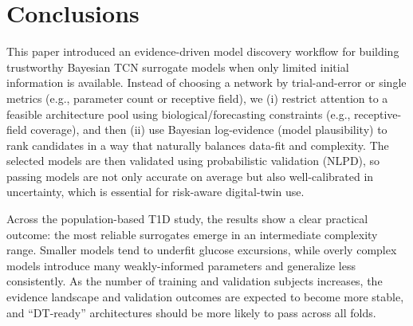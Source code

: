\documentclass[preprint,12pt]{elsarticle}
\begin{document}





%




\section{Conclusions}\label{sec:conclusions}

This paper introduced an evidence-driven model discovery workflow for building trustworthy Bayesian TCN surrogate models when only limited initial information is available. Instead of choosing a network by trial-and-error or single metrics (e.g., parameter count or receptive field), we (i) restrict attention to a feasible architecture pool using biological/forecasting constraints (e.g., receptive-field coverage), and then (ii) use Bayesian log-evidence (model plausibility) to rank candidates in a way that naturally balances data-fit and complexity. The selected models are then validated using probabilistic validation (NLPD), so passing models are not only accurate on average but also well-calibrated in uncertainty, which is essential for risk-aware digital-twin use. 

\noindent
Across the population-based T1D study, the results show a clear practical outcome: the most reliable surrogates emerge in an intermediate complexity range. Smaller models tend to underfit glucose excursions, while overly complex models introduce many weakly-informed parameters and generalize less consistently. As the number of training and validation subjects increases, the evidence landscape and validation outcomes are expected to become more stable, and “DT-ready” architectures should be more likely to pass across all folds.
\end{document}
